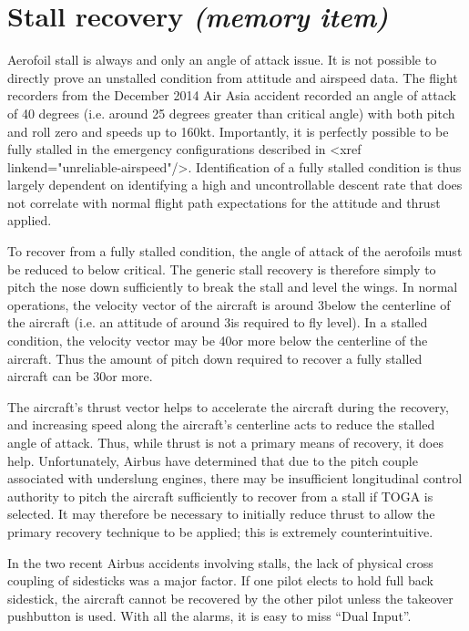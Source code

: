 \documentclass[a5paper,11pt,twoside]{book}
\newcommand{\inlcite}[1]{{\footnotesize\scshape\MakeLowercase{[#1]}}}
\newcommand{\multicite}[1]{%

  \nopagebreak
  \noindent{{\color{blue}\inlcite{#1}}}
}
\begin{document}
\multicite{QRH~AER.80, FCOM~PRO.AER.MISC}

\section{Stall recovery \emph{(memory item)}}

Aerofoil stall is always and only an angle of attack issue. It is not possible
to directly prove an unstalled condition from attitude and airspeed data. The
flight recorders from the December 2014 Air Asia accident recorded an angle of
attack of 40 degrees (i.e. around 25 degrees greater than critical angle) with
both pitch and roll zero and speeds up to 160kt. Importantly, it is perfectly
possible to be fully stalled in the emergency configurations described in <xref
linkend="unreliable-airspeed"/>. Identification of a fully stalled condition is
thus largely dependent on identifying a high and uncontrollable descent rate
that does not correlate with normal flight path expectations for the attitude
and thrust applied.

To recover from a fully stalled condition, the angle of attack of the aerofoils
must be reduced to below critical. The generic stall recovery is therefore
simply to pitch the nose down sufficiently to break the stall and level the
wings. In normal operations, the velocity vector of the aircraft is around
3\textdegree{ }below the centerline of the aircraft (i.e. an attitude of around
3\textdegree{ }is required to fly level). In a stalled condition, the velocity
vector may be 40\textdegree{ }or more below the centerline of the
aircraft. Thus the amount of pitch down required to recover a fully stalled
aircraft can be 30\textdegree{ }or more.

The aircraft's thrust vector helps to accelerate the aircraft during the
recovery, and increasing speed along the aircraft's centerline acts to reduce
the stalled angle of attack. Thus, while thrust is not a primary means of
recovery, it does help. Unfortunately, Airbus have determined that due to the
pitch couple associated with underslung engines, there may be insufficient
longitudinal control authority to pitch the aircraft sufficiently to recover
from a stall if TOGA is selected. It may therefore be necessary to initially
reduce thrust to allow the primary recovery technique to be applied; this is
extremely counterintuitive.

In the two recent Airbus accidents involving stalls, the lack of physical cross
coupling of sidesticks was a major factor. If one pilot elects to hold full back
sidestick, the aircraft cannot be recovered by the other pilot unless the
takeover pushbutton is used. With all the alarms, it is easy to miss ``Dual
Input''.
\end{document}
